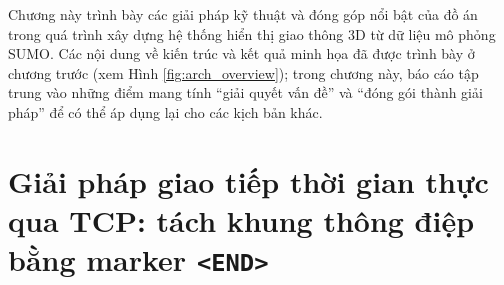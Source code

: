 \documentclass[../DoAn.tex]{subfiles}
\begin{document}




Chương này trình bày các giải pháp kỹ thuật và đóng góp nổi bật của đồ án trong quá trình xây dựng hệ thống hiển thị giao thông 3D từ dữ liệu mô phỏng SUMO. Các nội dung về kiến trúc và kết quả minh họa đã được trình bày ở chương trước (xem Hình \ref{fig:arch_overview}); trong chương này, báo cáo tập trung vào những điểm mang tính ``giải quyết vấn đề'' và ``đóng gói thành giải pháp'' để có thể áp dụng lại cho các kịch bản khác.

\section{Giải pháp giao tiếp thời gian thực qua TCP: tách khung thông điệp bằng marker \texttt{<END>}}\label{sec:tcp_framing}
\end{document}
